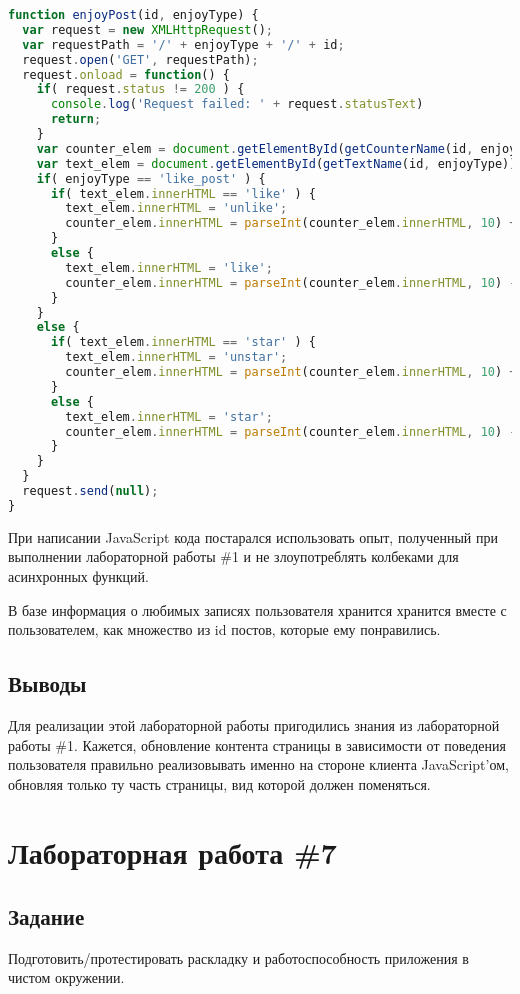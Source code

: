 \documentclass[14pt, a4paper]{extreport}
\begin{document}
\begin{lstlisting}[language=JavaScript]
function enjoyPost(id, enjoyType) {
  var request = new XMLHttpRequest();
  var requestPath = '/' + enjoyType + '/' + id;
  request.open('GET', requestPath);
  request.onload = function() {
    if( request.status != 200 ) {
      console.log('Request failed: ' + request.statusText)
      return;
    }
    var counter_elem = document.getElementById(getCounterName(id, enjoyType));
    var text_elem = document.getElementById(getTextName(id, enjoyType));
    if( enjoyType == 'like_post' ) {
      if( text_elem.innerHTML == 'like' ) {
        text_elem.innerHTML = 'unlike';
        counter_elem.innerHTML = parseInt(counter_elem.innerHTML, 10) + 1;
      }
      else {
        text_elem.innerHTML = 'like';
        counter_elem.innerHTML = parseInt(counter_elem.innerHTML, 10) - 1;
      }
    }
    else {
      if( text_elem.innerHTML == 'star' ) {
        text_elem.innerHTML = 'unstar';
        counter_elem.innerHTML = parseInt(counter_elem.innerHTML, 10) + 1;
      }
      else {
        text_elem.innerHTML = 'star';
        counter_elem.innerHTML = parseInt(counter_elem.innerHTML, 10) - 1;
      }
    }
  }
  request.send(null);
}
\end{lstlisting}

При написании JavaScript кода постарался использовать опыт, полученный при выполнении
лабораторной работы \#1 и не злоупотреблять колбеками для асинхронных функций.

В базе информация о любимых записях пользователя хранится хранится вместе с пользователем,
как множество из id постов, которые ему понравились.

\subsection*{Выводы}
Для реализации этой лабораторной работы пригодились знания из
лабораторной работы \#1. Кажется, обновление контента страницы
в зависимости от поведения пользователя правильно реализовывать
именно на стороне клиента JavaScript'ом, обновляя только ту часть страницы,
вид которой должен поменяться.

\section*{Лабораторная работа \#7}
\subsection*{Задание}
Подготовить/протестировать раскладку и работоспособность приложения в чистом
окружении.
\end{document}
